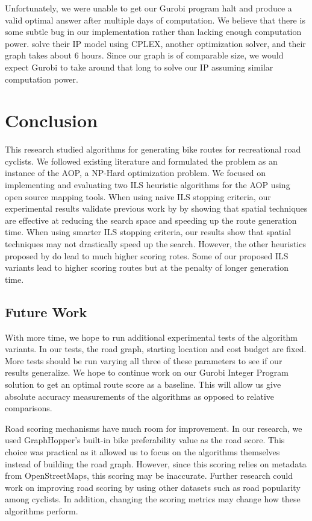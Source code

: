 \documentclass[honors]{union-cs-thesis}
\begin{document}
Unfortunately, we were unable to get our Gurobi program halt and produce a valid optimal answer after multiple days of computation. We believe that there is some subtle bug in our implementation rather than lacking enough computation power. \citeauthor{verbeeck2014extension} solve their IP model using CPLEX, another optimization solver, and their graph takes about 6 hours. Since our graph is of comparable size, we would expect Gurobi to take around that long to solve our IP assuming similar computation power.

\section{Conclusion}
This research studied algorithms for generating bike routes for recreational road cyclists. We followed existing literature and formulated the problem as an instance of the AOP, a NP-Hard optimization problem. We focused on implementing and evaluating two ILS heuristic algorithms \cite{verbeeck2014extension} \cite{lu2015arc} for the AOP using open source mapping tools. When using naive ILS stopping criteria, our experimental results validate previous work by \cite{lu2015arc} by showing that spatial techniques are effective at reducing the search space and speeding up the route generation time. When using smarter ILS stopping criteria, our results show that spatial techniques may not drastically speed up the search. However, the other heuristics proposed by \cite{lu2015arc} do lead to much higher scoring rotes. Some of our proposed ILS variants lead to higher scoring routes but at the penalty of longer generation time.

\subsection{Future Work}
With more time, we hope to run additional experimental tests of the algorithm variants. In our tests, the road graph, starting location and cost budget are fixed. More tests should be run varying all three of these parameters to see if our results generalize. We hope to continue work on our Gurobi Integer Program solution to get an optimal route score as a baseline. This will allow us give absolute accuracy measurements of the algorithms as opposed to relative comparisons.  

Road scoring mechanisms have much room for improvement. In our research, we used GraphHopper's built-in bike preferability value as the road score. This choice was practical as it allowed us to focus on the algorithms themselves instead of building the road graph. However, since this scoring relies on metadata from OpenStreetMaps, this scoring may be inaccurate. Further research could work on improving road scoring by using other datasets such as road popularity among cyclists. In addition, changing the scoring metrics may change how these algorithms perform.
\end{document}
